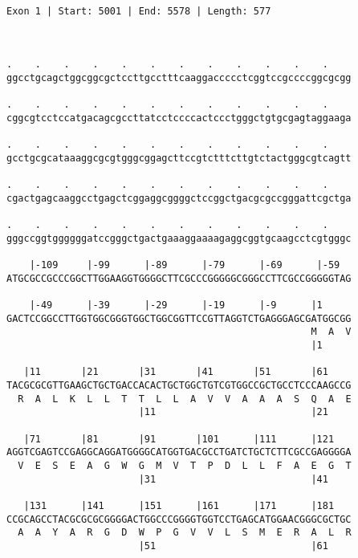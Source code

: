 \documentclass{article}
\begin{document}
 \begin{Verbatim}
 
Exon 1 | Start: 5001 | End: 5578 | Length: 577



.    .    .    .    .    .    .    .    .    .    .    .    
ggcctgcagctggcggcgctccttgcctttcaaggaccccctcggtccgccccggcgcgg
                                                            
.    .    .    .    .    .    .    .    .    .    .    .    
cggcgtcctccatgacagcgccttatcctccccactccctgggctgtgcgagtaggaaga
                                                            
.    .    .    .    .    .    .    .    .    .    .    .    
gcctgcgcataaaggcgcgtgggcggagcttccgtctttcttgtctactgggcgtcagtt
                                                            
.    .    .    .    .    .    .    .    .    .    .    .    
cgactgagcaaggcctgagctcggaggcggggctccggctgacgcgccgggattcgctga
                                                            
.    .    .    .    .    .    .    .    .    .    .    .    
gggccggtggggggatccgggctgactgaaaggaaaagaggcggtgcaagcctcgtgggc
                                                            
    |-109     |-99      |-89      |-79      |-69      |-59  
ATGCGCCGCCCGGCTTGGAAGGTGGGGCTTCGCCCGGGGGCGGGCCTTCGCCGGGGGTAG
                                                            
    |-49      |-39      |-29      |-19      |-9      |1     
GACTCCGGCCTTGGTGGCGGGTGGCTGGCGGTTCCGTTAGGTCTGAGGGAGCGATGGCGG
                                                     M  A  V
                                                     |1     
  
   |11       |21       |31       |41       |51       |61    
TACGCGCGTTGAAGCTGCTGACCACACTGCTGGCTGTCGTGGCCGCTGCCTCCCAAGCCG
  R  A  L  K  L  L  T  T  L  L  A  V  V  A  A  A  S  Q  A  E
                       |11                           |21    
  
   |71       |81       |91       |101      |111      |121   
AGGTCGAGTCCGAGGCAGGATGGGGCATGGTGACGCCTGATCTGCTCTTCGCCGAGGGGA
  V  E  S  E  A  G  W  G  M  V  T  P  D  L  L  F  A  E  G  T
                       |31                           |41    
  
   |131      |141      |151      |161      |171      |181   
CCGCAGCCTACGCGCGCGGGGACTGGCCCGGGGTGGTCCTGAGCATGGAACGGGCGCTGC
  A  A  Y  A  R  G  D  W  P  G  V  V  L  S  M  E  R  A  L  R
                       |51                           |61    
  

\end{Verbatim}
\end{document}
